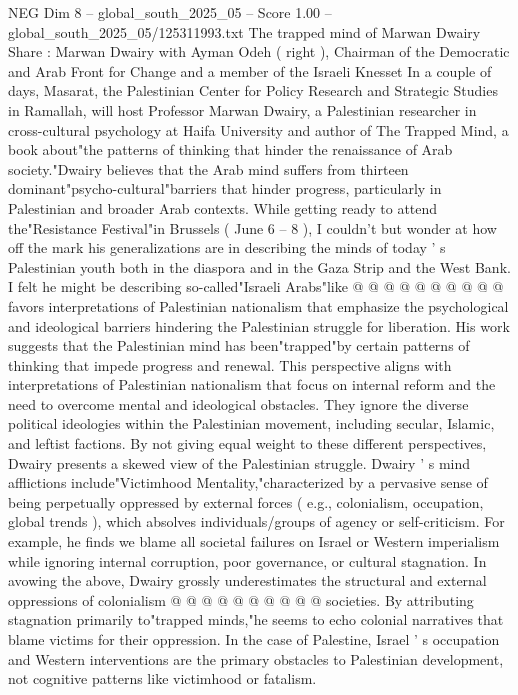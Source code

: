 \begin{textsample}{NEG Dim 8 – global\_south\_2025\_05 – Score 1.00 – global\_south\_2025\_05/125311993.txt}  \label{ex:f8_neg_316}
The trapped mind of Marwan Dwairy Share : Marwan Dwairy with Ayman Odeh ( right ), Chairman of the Democratic and Arab Front for Change and a member of the Israeli Knesset In a couple of days, Masarat, the Palestinian Center for Policy Research and Strategic Studies in Ramallah, will host Professor Marwan Dwairy, a Palestinian researcher in cross-cultural psychology at Haifa University and author of The Trapped Mind, a book about"the patterns of thinking that hinder the renaissance of Arab society."Dwairy believes that the Arab mind suffers from thirteen dominant"psycho-cultural"barriers that hinder progress, particularly in Palestinian and broader Arab contexts.
While getting ready to attend the"Resistance Festival"in Brussels ( June 6 -- 8 ), I couldn't but wonder at how off the mark his generalizations are in describing the minds of today ' s Palestinian youth both in the diaspora and in the Gaza Strip and the West Bank.
I felt he might be describing so-called"Israeli Arabs"like @ @ @ @ @ @ @ @ @ @ favors interpretations of Palestinian nationalism that emphasize the psychological and ideological barriers hindering the Palestinian struggle for liberation.
His work suggests that the Palestinian mind has been"trapped"by certain patterns of thinking that impede progress and renewal.
This perspective aligns with interpretations of Palestinian nationalism that focus on internal reform and the need to overcome mental and ideological obstacles.
They ignore the diverse political ideologies within the Palestinian movement, including secular, Islamic, and leftist factions.
By not giving equal weight to these different perspectives, Dwairy presents a skewed view of the Palestinian struggle.
Dwairy ' s mind afflictions include"Victimhood Mentality,"characterized by a pervasive sense of being perpetually oppressed by external forces ( e.g., colonialism, occupation, global trends ), which absolves individuals/groups of agency or self-criticism.
For example, he finds we blame all societal failures on Israel or Western imperialism while ignoring internal corruption, poor governance, or cultural stagnation.
In avowing the above, Dwairy grossly underestimates the structural and external oppressions of colonialism @ @ @ @ @ @ @ @ @ @ societies.
By attributing stagnation primarily to"trapped minds,"he seems to echo colonial narratives that blame victims for their oppression.
In the case of Palestine, Israel ' s occupation and Western interventions are the primary obstacles to Palestinian development, not cognitive patterns like victimhood or fatalism.

\end{textsample}
